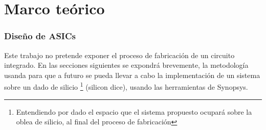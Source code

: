 \chapter{Marco teórico}
\label{ch:marco}
\subsection*{Diseño de ASICs}

%
%
%
%
%
%

Este trabajo no pretende exponer el proceso de fabricación de un circuito integrado. En las secciones siguientes se expondrá brevemente, la metodología usanda para que a futuro se pueda llevar a cabo la implementación de un sistema sobre un dado de silicio \footnote{Entendiendo por dado el espacio que el sistema propuesto ocupará sobre la oblea de silicio, al final del proceso de fabricación} (silicon dice), usando las herramientas de Synopsys.

